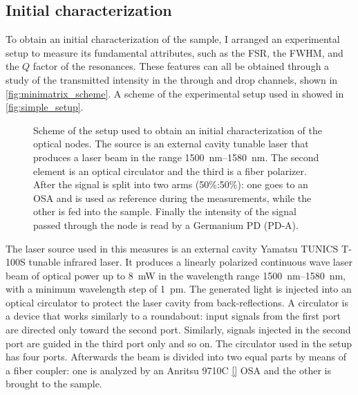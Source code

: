 \subsection{Initial characterization}
\label{ssec:initial_characterization}
To obtain an initial characterization of the sample, I arranged an experimental setup to measure its fundamental attributes, such as the \acf{FSR}, the \acf{FWHM}, and the $Q$ factor of the resonances.
These features can all be obtained through a study of the transmitted intensity in the through and drop channels, shown in \autoref{fig:minimatrix_scheme}.
A scheme of the experimental setup used in showed in \autoref{fig:simple_setup}.

\begin{figure}
	\centering
	
	\caption{Scheme of the setup used to obtain an initial characterization of the optical nodes.
		The source is an external cavity tunable laser that produces a laser beam in the range \SIrange{1500}{1580}{\nm}.
		The second element is an optical circulator and the third is a fiber polarizer.
		After the signal is split into two arms (50\%:50\%): one goes to an \acs{OSA} and is used as reference during the measurements, while the other is fed into the sample.
		Finally the intensity of the signal passed through the node is read by a Germanium \acs{PD} (PD-A).
		}
	\label{fig:simple_setup}
\end{figure}

The laser source used in this measures is an external cavity Yamatsu TUNICS T-100S tunable infrared laser.
It produces a linearly polarized continuous wave laser beam of optical power up to \SI{8}{\mW} in the wavelength range \SIrange{1500}{1580}{\nm}, with a minimum wavelength step of \SI{1}{\pm}.
The generated light is injected into an optical circulator to protect the laser cavity from back-reflections.
A circulator is a device that works similarly to a roundabout: input signals from the first port are directed only toward the second port. Similarly, signals injected in the second port are guided in the third port only and so on.
The circulator used in the setup has four ports.
Afterwards the beam is divided into two equal parts by means of a fiber coupler: one is analyzed by an Anritsu 9710C \ref{} \acf{OSA} and the other is brought to the sample.

